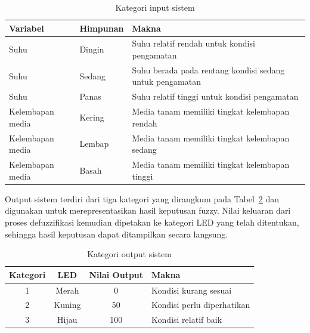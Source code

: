 \documentclass[12pt,a4paper]{article}
\begin{document}
\begin{table}[H]
    \centering
    \caption{Kategori input sistem}
    \label{tab:kategoriinput}
    \begin{tabularx}{\textwidth}{p{} p{} X}
        \toprule
        \textbf{Variabel} &
        \textbf{Himpunan} &
        \textbf{Makna} \\
        \midrule

        Suhu &
        Dingin &
        Suhu relatif rendah untuk kondisi pengamatan \\

        Suhu &
        Sedang &
        Suhu berada pada rentang kondisi sedang untuk pengamatan \\

        Suhu &
        Panas &
        Suhu relatif tinggi untuk kondisi pengamatan \\

        Kelembapan media &
        Kering &
        Media tanam memiliki tingkat kelembapan rendah \\

        Kelembapan media &
        Lembap &
        Media tanam memiliki tingkat kelembapan sedang \\

        Kelembapan media &
        Basah &
        Media tanam memiliki tingkat kelembapan tinggi \\

        \bottomrule
    \end{tabularx}
\end{table}

Output sistem terdiri dari tiga kategori yang dirangkum pada Tabel~\ref{tab:output} dan digunakan untuk merepresentasikan hasil keputusan fuzzy. Nilai keluaran dari proses defuzzifikasi kemudian dipetakan ke kategori LED yang telah ditentukan, sehingga hasil keputusan dapat ditampilkan secara langsung.

\begin{table}[H]
    \centering
    \caption{Kategori output sistem}
    \label{tab:output}
    \begin{tabularx}{\textwidth}{c c c X}
        \toprule
        \textbf{Kategori} &
        \textbf{LED} &
        \textbf{Nilai Output} &
        \textbf{Makna} \\
        \midrule

        1 &
        Merah &
        0 &
        Kondisi kurang sesuai \\

        2 &
        Kuning &
        50 &
        Kondisi perlu diperhatikan \\

        3 &
        Hijau &
        100 &
        Kondisi relatif baik \\

        \bottomrule
    \end{tabularx}
\end{table}
\end{document}
